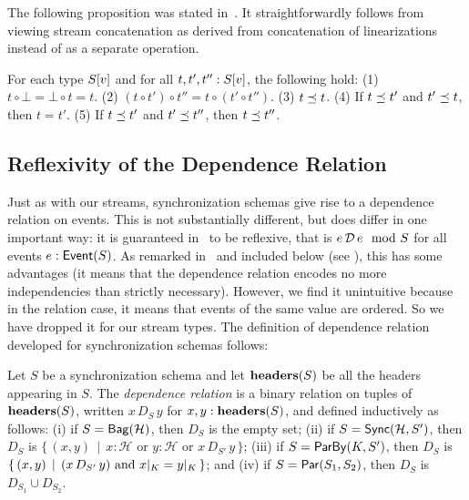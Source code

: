 The following proposition was stated in~.
It straightforwardly follows from viewing stream concatenation as derived from concatenation of linearizations instead of as a separate operation.

\begin{proposition}
\label{45:prop:sps-concat-properties}
For each type $\spstype{v}{S}$ and for all $t, t', t'': \spstype{v}{S}$,
the following hold:
(1) $t \circ \bot = \bot \circ t = t$.
(2) $(t \circ t') \circ t'' = t \circ (t' \circ t'')$.
(3) $t \prefix t$.
(4) If $t \prefix t'$ and $t' \prefix t$, then $t = t'$.
(5) If $t \prefix t'$ and $t' \prefix t''$, then $t \prefix t''$.
\end{proposition}

\subsection{Reflexivity of the Dependence Relation}

Just as with our streams, synchronization schemas give rise to a dependence relation on events.
This is not substantially different, but does differ in one important way: it is guaranteed in~ to be reflexive, that is $\deptype{e}{e}{S}$ for all events $\eventtype{e}{S}$.
As remarked in~ and included below (see ), this has some advantages (it means that the dependence relation encodes no more independencies than strictly necessary).
However, we find it unintuitive because in the relation case, it means that events of the same value are ordered. So we have dropped it for our stream types.
The definition of dependence relation developed for synchronization schemas follows:

\begin{definition}
\label{45:def:dep-relation}
Let $S$ be a synchronization schema and let $\headers(S)$ be all the headers appearing in $S$.
The \emph{dependence relation} is a binary relation on tuples of $\headers(S)$, written $x\, D_{S}\, y$ for $x, y: \headers(S)$, and defined inductively as follows:
(i) if $S = \relleaf{\mathcal{H}}$, then $D_{S}$ is the empty set;
(ii) if $S = \hier{\mathcal{H}}{S'}$, then
$D_{S}$ is $\{\, (x, y)\,\mid\,
    x : \mathcal{H}
    \text{ or } y : \mathcal{H}
    \text{ or } x\, D_{S'}\, y\,\}$;
(iii) if $S = \keyby{K}{S'}$, then
$D_{S}$ is $\{\, (x, y) \,\mid\,
    (x\, D_{S'}\, y) \text{ and } \tuprestrict{x}{K} = \tuprestrict{y}{K}\,\}$; and
(iv) if $S = \parcomp{S_1}{S_2}$, then
$D_{S}$ is $D_{S_1} \cup D_{S_2}$.
\end{definition}

